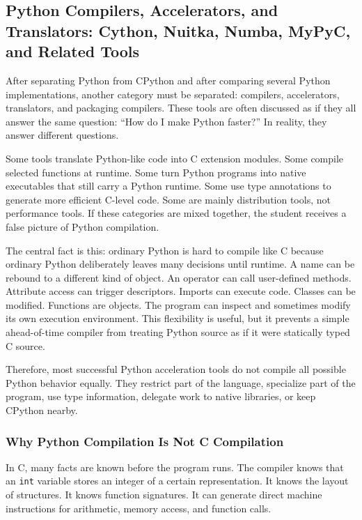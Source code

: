 \subsection{Python Compilers, Accelerators, and Translators: Cython, Nuitka, Numba, MyPyC, and Related Tools}

After separating Python from CPython and after comparing several Python implementations, another category must be separated: compilers, accelerators, translators, and packaging compilers. These tools are often discussed as if they all answer the same question: “How do I make Python faster?” In reality, they answer different questions.

Some tools translate Python-like code into C extension modules. Some compile selected functions at runtime. Some turn Python programs into native executables that still carry a Python runtime. Some use type annotations to generate more efficient C-level code. Some are mainly distribution tools, not performance tools. If these categories are mixed together, the student receives a false picture of Python compilation.

The central fact is this: ordinary Python is hard to compile like C because ordinary Python deliberately leaves many decisions until runtime. A name can be rebound to a different kind of object. An operator can call user-defined methods. Attribute access can trigger descriptors. Imports can execute code. Classes can be modified. Functions are objects. The program can inspect and sometimes modify its own execution environment. This flexibility is useful, but it prevents a simple ahead-of-time compiler from treating Python source as if it were statically typed C source.

Therefore, most successful Python acceleration tools do not compile all possible Python behavior equally. They restrict part of the language, specialize part of the program, use type information, delegate work to native libraries, or keep CPython nearby.

\subsubsection{Why Python Compilation Is Not C Compilation}

In C, many facts are known before the program runs. The compiler knows that an \texttt{int} variable stores an integer of a certain representation. It knows the layout of structures. It knows function signatures. It can generate direct machine instructions for arithmetic, memory access, and function calls.

